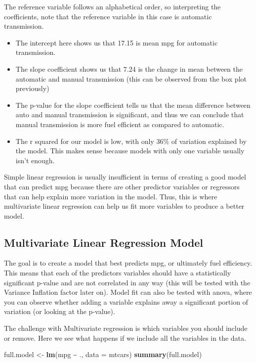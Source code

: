 \documentclass[
]{article}
\newenvironment{Shaded}{\begin{snugshade}}{\end{snugshade}}
\newcommand{\AttributeTok}[1]{\textcolor[rgb]{0.13,0.29,0.53}{#1}}
\newcommand{\FunctionTok}[1]{\textcolor[rgb]{0.13,0.29,0.53}{\textbf{#1}}}
\newcommand{\NormalTok}[1]{#1}
\newcommand{\OtherTok}[1]{\textcolor[rgb]{0.56,0.35,0.01}{#1}}
\newcommand{\SpecialCharTok}[1]{\textcolor[rgb]{0.81,0.36,0.00}{\textbf{#1}}}
\providecommand{\tightlist}{%
  \setlength{\itemsep}{0pt}\setlength{\parskip}{0pt}}
\begin{document}
The reference variable follows an alphabetical order, so interpreting
the coefficients, note that the reference variable in this case is
automatic transmission.

\begin{itemize}
\tightlist
\item
  The intercept here shows us that 17.15 is mean mpg for automatic
  transmission.
\item
  The slope coefficient shows us that 7.24 is the change in mean between
  the automatic and manual transmission (this can be observed from the
  box plot previously)
\item
  The p-value for the slope coefficient tells us that the mean
  difference between auto and manual transmission is significant, and
  thus we can conclude that manual transmission is more fuel efficient
  as compared to automatic.
\item
  The r squared for our model is low, with only 36\% of variation
  explained by the model. This makes sense because models with only one
  variable usually isn't enough.
\end{itemize}

Simple linear regression is usually insufficient in terms of creating a
good model that can predict mpg because there are other predictor
variables or regressors that can help explain more variation in the
model. Thus, this is where multivariate linear regression can help us
fit more variables to produce a better model.

\subsection{Multivariate Linear Regression
Model}\label{multivariate-linear-regression-model}

The goal is to create a model that best predicts mpg, or ultimately fuel
efficiency. This means that each of the predictors variables should have
a statistically significant p-value and are not correlated in any way
(this will be tested with the Variance Inflation factor later on). Model
fit can also be tested with anova, where you can observe whether adding
a variable explains away a significant portion of variation (or looking
at the p-value).

The challenge with Multivariate regression is which variables you should
include or remove. Here we see what happens if we include all the
variables in the data.

\begin{Shaded}
\begin{Highlighting}[]
\NormalTok{full.model }\OtherTok{\textless{}{-}} \FunctionTok{lm}\NormalTok{(mpg }\SpecialCharTok{\textasciitilde{}}\NormalTok{ ., }\AttributeTok{data =}\NormalTok{ mtcars)}
\FunctionTok{summary}\NormalTok{(full.model) }
\end{Highlighting}
\end{Shaded}
\end{document}

